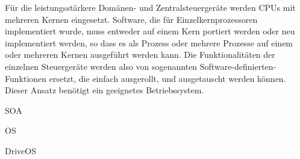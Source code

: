 Für die leistungsstärkere Domänen- und Zentralsteuergeräte werden CPUs mit mehreren Kernen eingesetzt. Software, die für Einzelkernprozessoren implementiert wurde, muss entweder auf einem Kern portiert werden oder neu implementiert werden, so dass es als Prozess oder mehrere Prozesse auf einem oder mehreren Kernen ausgeführt werden kann. \cite{Widlund2017} Die Funktionalitäten der einzelnen Steuergeräte werden also von sogenannten Software-definierten-Funktionen ersetzt, die einfach ausgerollt, und ausgetauscht werden können. Dieser Ansatz benötigt ein geeignetes Betriebssystem. 

SOA

OS



\cite{Bandur2021}

DriveOS \cite{Sinha2021}